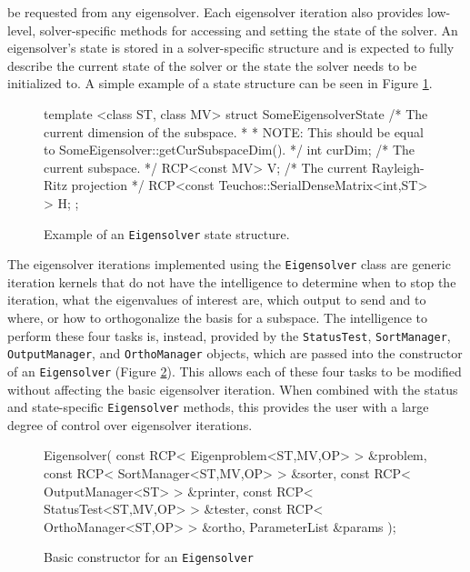 \documentclass[acmtoms,acmnow]{acmtrans2m}
\newcommand{\aspace}[1]{\texttt{#1}}
\begin{document}
be requested from any eigensolver.  Each eigensolver iteration also provides low-level, 
solver-specific methods for accessing and setting the state of the solver.  
An eigensolver's state is stored in a solver-specific structure and is expected to fully describe 
the current state of the solver or the state the solver needs to be initialized to.  
A simple example of a state structure can be seen in Figure \ref{fig:state}.
\begin{figure}[htb]
\begin{center}
\begin{boxedverbatim}
  template <class ST, class MV>
  struct SomeEigensolverState {
    /* The current dimension of the subspace.                              *
     * NOTE: This should be equal to SomeEigensolver::getCurSubspaceDim(). */
    int curDim;
    /* The current subspace. */
    RCP<const MV> V;
    /* The current Rayleigh-Ritz projection */
    RCP<const Teuchos::SerialDenseMatrix<int,ST> > H;
  };
\end{boxedverbatim}
\end{center}
\caption{Example of an \aspace{Eigensolver} state structure.}
\label{fig:state}
\end{figure}

The eigensolver iterations implemented using the \aspace{Eigensolver} class are generic
iteration kernels that do not have the intelligence to determine when to stop the
iteration, what the eigenvalues of interest are, which output to send and to where, or how
to orthogonalize the basis for a subspace.  The intelligence to perform these four tasks
is, instead, provided by the \aspace{StatusTest}, \aspace{SortManager},
\aspace{OutputManager}, and \aspace{OrthoManager} objects, which are passed into the
constructor of an \aspace{Eigensolver} (Figure \ref{fig:constructor}).  This allows each
of these four tasks to be modified without affecting the basic eigensolver iteration. When
combined with the status and state-specific \aspace{Eigensolver} methods, this provides
the user with a large degree of control over eigensolver iterations.
\begin{figure}[htb]
\begin{center}
\begin{boxedverbatim}
Eigensolver(
   const RCP< Eigenproblem<ST,MV,OP> > &problem,
   const RCP< SortManager<ST,MV,OP>  > &sorter,
   const RCP< OutputManager<ST>      > &printer,
   const RCP< StatusTest<ST,MV,OP>   > &tester,
   const RCP< OrthoManager<ST,OP>    > &ortho,
   ParameterList                       &params
 );
\end{boxedverbatim}
\end{center}
\caption{Basic constructor for an \aspace{Eigensolver}}
\label{fig:constructor}
\end{figure}
\end{document}
